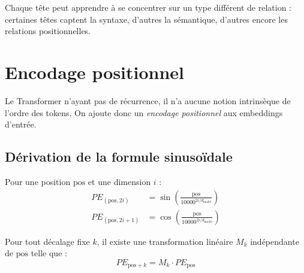 \begin{remarque}
Chaque t\^ete peut apprendre \`a se concentrer sur un type diff\'erent de relation : certaines t\^etes captent la syntaxe, d'autres la s\'emantique, d'autres encore les relations positionnelles.
\end{remarque}

\section{Encodage positionnel}
\label{sec:positional-encoding}

Le Transformer n'ayant pas de r\'ecurrence, il n'a aucune notion intrins\`eque de l'ordre des tokens. On ajoute donc un \emph{encodage positionnel} aux embeddings d'entr\'ee.

\subsection{D\'erivation de la formule sinuso\"idale}

\begin{definition}
Pour une position $\text{pos}$ et une dimension $i$ :
\begin{align}
PE_{(\text{pos}, 2i)} &= \sin\!\left(\frac{\text{pos}}{10000^{2i/d_{\text{model}}}}\right) \label{eq:pe-sin}\\
PE_{(\text{pos}, 2i+1)} &= \cos\!\left(\frac{\text{pos}}{10000^{2i/d_{\text{model}}}}\right) \label{eq:pe-cos}
\end{align}
\end{definition}

\begin{theoreme}
Pour tout d\'ecalage fixe $k$, il existe une transformation lin\'eaire $M_k$ ind\'ependante de $\text{pos}$ telle que :
\begin{equation}
PE_{\text{pos}+k} = M_k \cdot PE_{\text{pos}}
\end{equation}
\end{theoreme}


